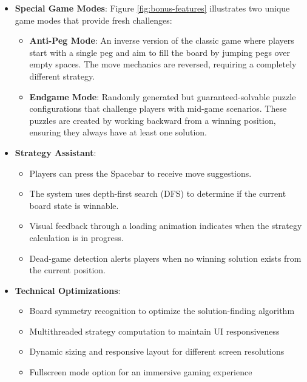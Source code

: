 \begin{itemize}
    \item \textbf{Special Game Modes}:
    Figure \ref{fig:bonus-features} illustrates two unique game modes that provide fresh challenges:
    \begin{itemize}
        \item \textbf{Anti-Peg Mode}: An inverse version of the classic game where players start with a single peg and aim to fill the board by jumping pegs over empty spaces. The move mechanics are reversed, requiring a completely different strategy.
        
        \item \textbf{Endgame Mode}: Randomly generated but guaranteed-solvable puzzle configurations that challenge players with mid-game scenarios. These puzzles are created by working backward from a winning position, ensuring they always have at least one solution.
    \end{itemize}
    
    \item \textbf{Strategy Assistant}:
    \begin{itemize}
        \item Players can press the Spacebar to receive move suggestions.
        \item The system uses depth-first search (DFS) to determine if the current board state is winnable.
        \item Visual feedback through a loading animation indicates when the strategy calculation is in progress.
        \item Dead-game detection alerts players when no winning solution exists from the current position.
    \end{itemize}
    
    \item \textbf{Technical Optimizations}:
    \begin{itemize}
        \item Board symmetry recognition to optimize the solution-finding algorithm
        \item Multithreaded strategy computation to maintain UI responsiveness
        \item Dynamic sizing and responsive layout for different screen resolutions
        \item Fullscreen mode option for an immersive gaming experience
    \end{itemize}
\end{itemize}